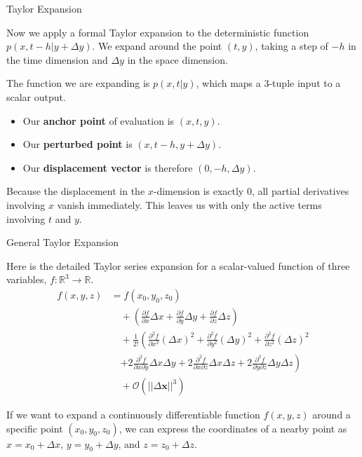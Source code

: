 \documentclass{beamer}
\begin{document}
\begin{frame}{Taylor Expansion}

Now we apply a formal Taylor expansion to the deterministic function $p(x, t - h | y + \Delta y)$. We expand around the point $(t, y)$, taking a step of $-h$ in the time dimension and $\Delta y$ in the space dimension.

The function we are expanding is $p(x, t|y)$, which maps a 3-tuple input to a scalar output.

\begin{itemize}
\item Our \textbf{anchor point} of evaluation is $(x, t, y)$.
\item Our \textbf{perturbed point} is $(x, t - h, y + \Delta y)$.
\item Our \textbf{displacement vector} is therefore $(0, -h, \Delta y)$.
\end{itemize}

Because the displacement in the $x$-dimension is exactly $0$, all partial derivatives involving $x$ vanish immediately. This leaves us with only the active terms involving $t$ and $y$.

\end{frame}

\begin{frame}{General Taylor Expansion}

Here is the detailed Taylor series expansion for a scalar-valued function of three variables, $f : \mathbb{R}^3 \rightarrow \mathbb{R}$.
\vspace{-0.3cm}
\begin{align*}
f(x, y, z) &= f(x_0, y_0, z_0) \\
&\quad + \left( \frac{\partial f}{\partial x} \Delta x + \frac{\partial f}{\partial y} \Delta y + \frac{\partial f}{\partial z} \Delta z \right) \\
&\quad + \frac{1}{2!} \left( \frac{\partial^2 f}{\partial x^2} (\Delta x)^2 + \frac{\partial^2 f}{\partial y^2} (\Delta y)^2 + \frac{\partial^2 f}{\partial z^2} (\Delta z)^2 \right. \\
&\quad \left. + 2\frac{\partial^2 f}{\partial x \partial y} \Delta x \Delta y + 2\frac{\partial^2 f}{\partial x \partial z} \Delta x \Delta z + 2\frac{\partial^2 f}{\partial y \partial z} \Delta y \Delta z \right) \\
&\quad + \mathcal{O}(||\Delta \mathbf{x}||^3)
\end{align*}

If we want to expand a continuously differentiable function $f(x, y, z)$ around a specific point $(x_0, y_0, z_0)$, we can express the coordinates of a nearby point as $x = x_0 + \Delta x$, $y = y_0 + \Delta y$, and $z = z_0 + \Delta z$.
\end{frame}
\end{document}
